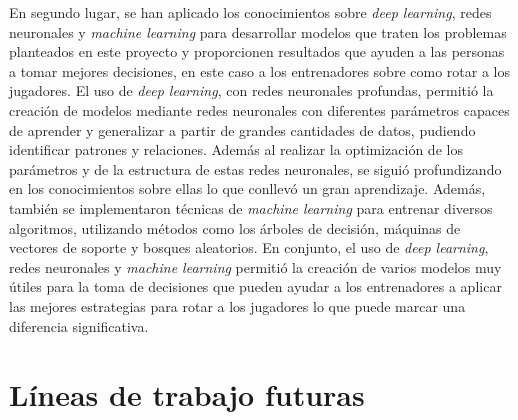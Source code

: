 En segundo lugar, se han aplicado los conocimientos sobre \textit{deep learning}, redes neuronales y \textit{machine learning} para desarrollar modelos que traten los problemas planteados en este proyecto y proporcionen resultados que ayuden a las personas a tomar mejores decisiones, en este caso a los entrenadores sobre como rotar a los jugadores. El uso de \textit{deep learning}, con redes neuronales profundas, permitió la creación de modelos mediante redes neuronales con diferentes parámetros capaces de aprender y generalizar a partir de grandes cantidades de datos, pudiendo identificar patrones y relaciones. Además al realizar la optimización de los parámetros y de la estructura de estas redes neuronales, se siguió profundizando en los conocimientos sobre ellas lo que conllevó un gran aprendizaje. Además, también se implementaron técnicas de \textit{machine learning} para entrenar diversos algoritmos, utilizando métodos como los árboles de decisión, máquinas de vectores de soporte y bosques aleatorios. En conjunto, el uso de \textit{deep learning}, redes neuronales y \textit{machine learning} permitió la creación de varios modelos muy útiles para la toma de decisiones que pueden ayudar a los entrenadores a aplicar las mejores estrategias para rotar a los jugadores lo que puede marcar una diferencia significativa.



\section{Líneas de trabajo futuras}


